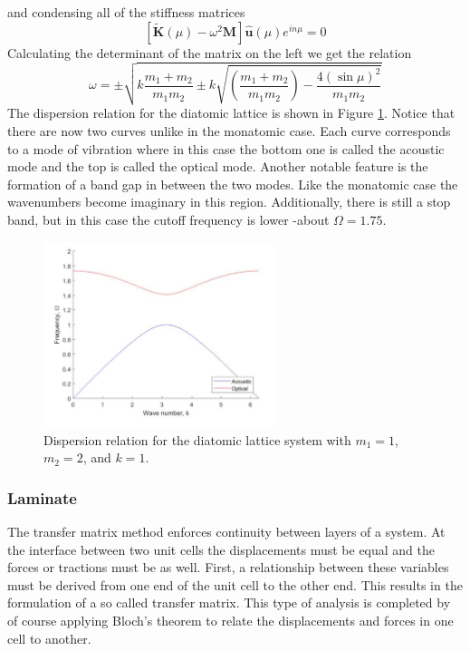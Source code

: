 \documentclass{article}
\begin{document}
and condensing all of the stiffness matrices
\begin{equation}
\left[\mathbf{\tilde{K}}(\mu) -\omega^2 \mathbf{M} \right] 
\mathbf{\hat{u}}(\mu)e^{in\mu} = 0
\end{equation}
Calculating the determinant of the matrix on the left we get the relation
\begin{equation}
\omega =\pm \sqrt{k\frac{m_1+m_2}{m_1m_2} \pm k 
\sqrt{\left(\frac{m_1+m_2}{m_1m_2}\right) - \frac{4(\sin{\mu})^2}{m_1m_2}}}
\end{equation}
The dispersion relation for the diatomic lattice is shown in Figure 
\ref{fig:dia-exact}. Notice that there are now two curves unlike in the 
monatomic case. Each curve corresponds to a mode of vibration where in this 
case the bottom one is called the acoustic mode and the top is called the 
optical mode. Another notable feature is the formation of a band gap in between 
the two modes. Like the monatomic case the wavenumbers become imaginary in this 
region. Additionally, there is still a stop band, but in this case the cutoff 
frequency is lower -about $\Omega = 1.75$.
\begin{figure}[!htbp]
	\centering
	\includegraphics[width=0.6\textwidth]{diatomic-exact.pdf}
	\caption{Dispersion relation for the diatomic lattice system with 
	$m_1=1$, $m_2=2$, and $k=1$.}
	\label{fig:dia-exact}
\end{figure}

\subsubsection{Laminate}
The transfer matrix method enforces continuity between layers of a system. At 
the interface between two unit cells the displacements must be equal and the 
forces or tractions must be as well. First, a relationship between these 
variables must be derived from one end of the unit cell to the other end. This 
results in the formulation of a so called transfer matrix. This type of 
analysis is completed by of course applying Bloch's theorem to relate the 
displacements and forces in one cell to another.
\end{document}
